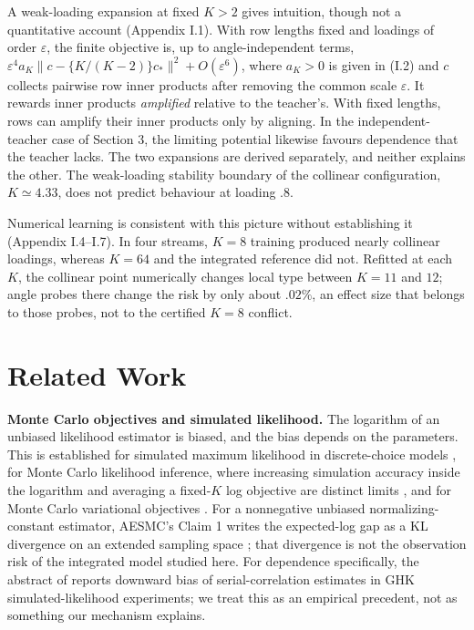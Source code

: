 \documentclass{article}
\begin{document}
A weak-loading expansion at fixed \(K>2\) gives intuition, though not a
quantitative account (Appendix I.1). With row lengths fixed and loadings
of order \(\varepsilon\), the finite objective is, up to
angle-independent terms,
\(\varepsilon^4a_K\|c-\{K/(K-2)\}c_*\|^2+O(\varepsilon^6)\), where
\(a_K>0\) is given in (I.2) and \(c\) collects pairwise row inner
products after removing the common scale \(\varepsilon\). It rewards
inner products \emph{amplified} relative to the teacher's. With fixed
lengths, rows can amplify their inner products only by aligning. In the
independent-teacher case of Section 3, the limiting potential likewise
favours dependence that the teacher lacks. The two expansions are
derived separately, and neither explains the other. The weak-loading
stability boundary of the collinear configuration, \(K\simeq4.33\), does
not predict behaviour at loading \(.8\).

Numerical learning is consistent with this picture without establishing
it (Appendix I.4--I.7). In four streams, \(K=8\) training produced
nearly collinear loadings, whereas \(K=64\) and the integrated reference
did not. Refitted at each \(K\), the collinear point numerically changes
local type between \(K=11\) and \(12\); angle probes there change the
risk by only about \(.02\%\), an effect size that belongs to those
probes, not to the certified \(K=8\) conflict.

\section{Related Work}\label{related-work}

\textbf{Monte Carlo objectives and simulated likelihood.} The logarithm
of an unbiased likelihood estimator is biased, and the bias depends on
the parameters. This is established for simulated maximum likelihood in
discrete-choice models \citep{lee1995}, for Monte Carlo likelihood
inference, where increasing simulation accuracy inside the logarithm and
averaging a fixed-\(K\) log objective are distinct limits
\citep{sung2007}, and for Monte Carlo variational objectives
\citep{maddison2017}. For a nonnegative unbiased normalizing-constant
estimator, AESMC's Claim 1 writes the expected-log gap as a KL
divergence on an extended sampling space \citep{le2018aesmc}; that
divergence is not the observation risk of the integrated model studied
here. For dependence specifically, the abstract of \citet{geweke1997}
reports downward bias of serial-correlation estimates in GHK
simulated-likelihood experiments; we treat this as an empirical
precedent, not as something our mechanism explains.
\end{document}
